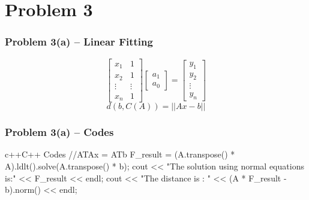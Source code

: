 \section{Problem 3}
\begin{frame}
        \frametitle{Problem 3(a) – Linear Fitting}

        \begin{equation}
            \begin{bmatrix}
                x_1 & 1 \\
                x_2 & 1 \\
                \vdots & \vdots \\
                x_n & 1
            \end{bmatrix}
            \begin{bmatrix}
                a_1 \\ a_0
            \end{bmatrix}
            =
            \begin{bmatrix}
                y_1 \\ y_2 \\ \vdots \\ y_n
            \end{bmatrix}
        \end{equation}
        \begin{equation}
            d\left(b,C\left(A\right)\right) = \left||Ax-b|\right|
        \end{equation}

    \end{frame}

\begin{frame}[fragile] 
    \frametitle{Problem 3(a) – Codes}
    \begin{codeblock}{c++}{C++ Codes}
        //ATAx = ATb
        F_result = (A.transpose() * A).ldlt().solve(A.transpose() * b);
        cout << "The solution using normal equations is:\n"
            << F_result << endl;
        cout << "The distance is : " << (A * F_result - b).norm() << endl;
    \end{codeblock}
\end{frame}

